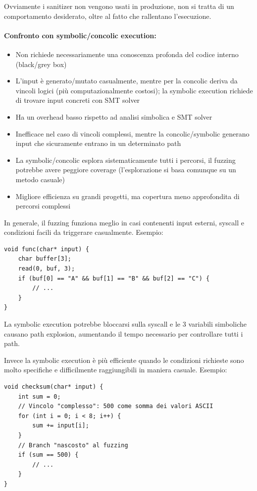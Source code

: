 Ovviamente i sanitizer non vengono usati in produzione, non si tratta di un comportamento desiderato, oltre al fatto che rallentano l'esecuzione.

\paragraph{Confronto con symbolic/concolic execution:}
\begin{itemize}
    \item Non richiede necessariamente una conoscenza profonda del codice interno (black/grey box)
    
    \item L'input è generato/mutato casualmente, mentre per la concolic deriva da vincoli logici (più computazionalmente costosi); la symbolic execution richiede di trovare input concreti con SMT solver
    
    \item Ha un overhead basso rispetto ad analisi simbolica e SMT solver
    
    \item Inefficace nel caso di vincoli complessi, mentre la concolic/symbolic generano input che sicuramente entrano in un determinato path
    
    \item La symbolic/concolic esplora sistematicamente tutti i percorsi, il fuzzing potrebbe avere peggiore coverage (l'esplorazione si basa comunque su un metodo casuale)
    
    \item Migliore efficienza su grandi progetti, ma copertura meno approfondita di percorsi complessi
\end{itemize}

In generale, il fuzzing funziona meglio in casi contenenti input esterni, syscall e condizioni facili da triggerare casualmente. Esempio:
\begin{verbatim}
void func(char* input) {
    char buffer[3];
    read(0, buf, 3);
    if (buf[0] == "A" && buf[1] == "B" && buf[2] == "C") {
        // ...
    }
}
\end{verbatim}
La symbolic execution potrebbe bloccarsi sulla syscall e le 3 variabili simboliche causano path explosion, aumentando il tempo necessario per controllare tutti i path.

Invece la symbolic execution è più efficiente quando le condizioni richieste sono molto specifiche e difficilmente raggiungibili in maniera casuale. Esempio:
\begin{verbatim}
void checksum(char* input) {
    int sum = 0;
    // Vincolo "complesso": 500 come somma dei valori ASCII
    for (int i = 0; i < 8; i++) {
        sum += input[i]; 
    }
    // Branch "nascosto" al fuzzing
    if (sum == 500) {
        // ...
    }
}
\end{verbatim}

